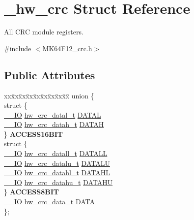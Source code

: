 \hypertarget{struct__hw__crc}{}\section{\+\_\+hw\+\_\+crc Struct Reference}
\label{struct__hw__crc}


All C\+RC module registers.  




{\ttfamily \#include $<$M\+K64\+F12\+\_\+crc.\+h$>$}

\subsection*{Public Attributes}
\begin{DoxyCompactItemize}
\item 
\begin{tabbing}
xx\=xx\=xx\=xx\=xx\=xx\=xx\=xx\=xx\=\kill
union \{\\
\>struct \{\\
\>\>\hyperlink{core__sc300_8h_aec43007d9998a0a0e01faede4133d6be}{\_\_IO} \hyperlink{union__hw__crc__datal}{hw\_crc\_datal\_t} \hyperlink{struct__hw__crc_a7aec2e51aaa0bf260a302885185f1c34}{DATAL}\\
\>\>\hyperlink{core__sc300_8h_aec43007d9998a0a0e01faede4133d6be}{\_\_IO} \hyperlink{union__hw__crc__datah}{hw\_crc\_datah\_t} \hyperlink{struct__hw__crc_a758e41fc3295c29098ba39a10ceb4b18}{DATAH}\\
\>\} {\bfseries ACCESS16BIT}\\
\>struct \{\\
\>\>\hyperlink{core__sc300_8h_aec43007d9998a0a0e01faede4133d6be}{\_\_IO} \hyperlink{union__hw__crc__datall}{hw\_crc\_datall\_t} \hyperlink{struct__hw__crc_a8c19ab81392da4cd92b34cccfeccf5db}{DATALL}\\
\>\>\hyperlink{core__sc300_8h_aec43007d9998a0a0e01faede4133d6be}{\_\_IO} \hyperlink{union__hw__crc__datalu}{hw\_crc\_datalu\_t} \hyperlink{struct__hw__crc_a85fd1a44ec8c21c91dfb2f844e3d1e9c}{DATALU}\\
\>\>\hyperlink{core__sc300_8h_aec43007d9998a0a0e01faede4133d6be}{\_\_IO} \hyperlink{union__hw__crc__datahl}{hw\_crc\_datahl\_t} \hyperlink{struct__hw__crc_aecb4e1ba4a6aa645329b8b5844cb3544}{DATAHL}\\
\>\>\hyperlink{core__sc300_8h_aec43007d9998a0a0e01faede4133d6be}{\_\_IO} \hyperlink{union__hw__crc__datahu}{hw\_crc\_datahu\_t} \hyperlink{struct__hw__crc_a028e1400ca87d21bdb3ff47b27bb7885}{DATAHU}\\
\>\} {\bfseries ACCESS8BIT}\\
\>\hyperlink{core__sc300_8h_aec43007d9998a0a0e01faede4133d6be}{\_\_IO} \hyperlink{union__hw__crc__data}{hw\_crc\_data\_t} \hyperlink{struct__hw__crc_a2afe4fac937ba7bf596871d5be13d126}{DATA}\\
\}; \hypertarget{struct__hw__crc_a2cdc2676615e3d30fa1cb7e4b91f51ff}{}\label{struct__hw__crc_a2cdc2676615e3d30fa1cb7e4b91f51ff}
\\


\end{tabbing}
\end{DoxyCompactItemize}

